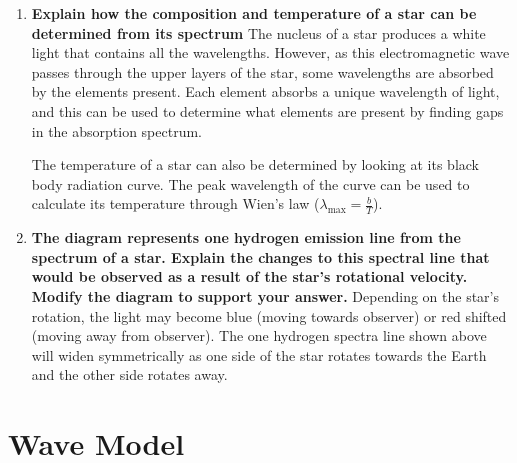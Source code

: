 \documentclass{report}
\begin{document}
\begin{enumerate}
			\item \textbf{Explain how the composition and temperature of a star can be determined from its spectrum}
				\subitem The nucleus of a star produces a white light that contains all the wavelengths. However, as this electromagnetic wave passes through the upper layers of the star, some wavelengths are absorbed by the elements present. Each element absorbs a unique wavelength of light, and this can be used to determine what elements are present by finding gaps in the absorption spectrum.

				The temperature of a star can also be determined by looking at its black body radiation curve. The peak wavelength of the curve can be used to calculate its temperature through Wien's law ($\lambda_\text{max} = \frac{b}{T}$).

			\item \textbf{The diagram represents one hydrogen emission line from the spectrum of a star. Explain the changes to this spectral line that would be observed as a result of the star’s rotational velocity. Modify the diagram to support your answer.}
				\subitem Depending on the star's rotation, the light may become blue (moving towards observer) or red shifted (moving away from observer). The one hydrogen spectra line shown above will widen symmetrically as one side of the star rotates towards the Earth and the other side rotates away.

		\end{enumerate}

	\section{Wave Model}
\end{document}
